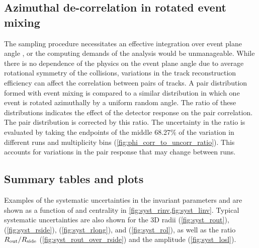 \subsection{Azimuthal de-correlation in rotated event mixing}
The sampling procedure necessitates an effective integration over event plane angle \psit, or the computing demands of the analysis would be unmanageable. While there is no dependence of the physics on the event plane angle due to average rotational symmetry of the collisions, variations in the track reconstruction efficiency can affect the correlation between pairs of tracks. A pair distribution formed with event mixing is compared to a similar distribution in which one event is rotated azimuthally by a uniform random angle. The ratio of these distributions indicates the effect of the detector response on the pair correlation. The pair distribution is corrected by this ratio. The uncertainty in the ratio is evaluated by taking the endpoints of the middle 68.27\% of the variation in different runs and multiplicity bins (\cref{fig:phi_corr_to_uncorr_ratio}). This accounts for variations in the pair response that may change between runs.

\FloatBarrier
\subsection{Summary tables and plots}
Examples of the systematic uncertainties in the invariant parameters \Rinv and \linv are shown as a function of \kt and centrality in \cref{fig:syst_rinv,fig:syst_linv}.
Typical systematic uncertainties are also shown for the 3D radii \Rout (\cref{fig:syst_rout}), \Rside (\cref{fig:syst_rside}), \Rlong (\cref{fig:syst_rlong}), and \Rol (\cref{fig:syst_rol}), as well as the ratio $R_{\mathrm{out}} / R_{\mathrm{side}}$ (\cref{fig:syst_rout_over_rside}) and the amplitude (\cref{fig:syst_losl}).

\begin{center}




\end{center}

